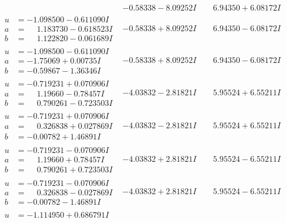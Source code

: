 \documentclass[1p]{elsarticle_modified}
\theoremstyle{definition}
\begin{document}
$$\begin{array}{c|c|c}
 & -0.58338 - 8.09252 I & \phantom{-}6.94350 + 6.08172 I \\ \hline\begin{aligned}
u &= -1.098500 - 0.611090 I \\
a &= \phantom{-}1.183730 - 0.618523 I \\
b &= \phantom{-}1.122820 - 0.061689 I\end{aligned}
 & -0.58338 + 8.09252 I & \phantom{-}6.94350 - 6.08172 I \\ \hline\begin{aligned}
u &= -1.098500 - 0.611090 I \\
a &= -1.75069 + 0.00735 I \\
b &= -0.59867 - 1.36346 I\end{aligned}
 & -0.58338 + 8.09252 I & \phantom{-}6.94350 - 6.08172 I \\ \hline\begin{aligned}
u &= -0.719231 + 0.070906 I \\
a &= \phantom{-}1.19660 - 0.78457 I \\
b &= \phantom{-}0.790261 - 0.723503 I\end{aligned}
 & -4.03832 - 2.81821 I & \phantom{-}5.95524 + 6.55211 I \\ \hline\begin{aligned}
u &= -0.719231 + 0.070906 I \\
a &= \phantom{-}0.326838 + 0.027869 I \\
b &= -0.00782 + 1.46891 I\end{aligned}
 & -4.03832 - 2.81821 I & \phantom{-}5.95524 + 6.55211 I \\ \hline\begin{aligned}
u &= -0.719231 - 0.070906 I \\
a &= \phantom{-}1.19660 + 0.78457 I \\
b &= \phantom{-}0.790261 + 0.723503 I\end{aligned}
 & -4.03832 + 2.81821 I & \phantom{-}5.95524 - 6.55211 I \\ \hline\begin{aligned}
u &= -0.719231 - 0.070906 I \\
a &= \phantom{-}0.326838 - 0.027869 I \\
b &= -0.00782 - 1.46891 I\end{aligned}
 & -4.03832 + 2.81821 I & \phantom{-}5.95524 - 6.55211 I \\ \hline\begin{aligned}
u &= -1.114950 + 0.686791 I \\

\end{aligned}
\end{array}$$
\end{document}
